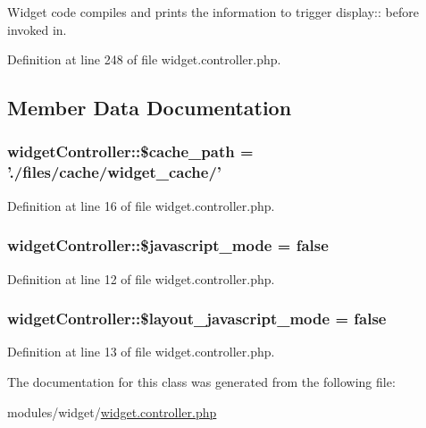 Widget code compiles and prints the information to trigger display\+:\+: before invoked in. 



Definition at line 248 of file widget.\+controller.\+php.



\subsection{Member Data Documentation}
\hypertarget{classwidgetController_a279375b189444d13250d8111910655c3}{
\subsubsection[{\$cache\+\_\+path}]{\setlength{\rightskip}{0pt plus 5cm}widget\+Controller\+::\$cache\+\_\+path = './files/cache/widget\+\_\+cache/'}}\label{classwidgetController_a279375b189444d13250d8111910655c3}


Definition at line 16 of file widget.\+controller.\+php.

\hypertarget{classwidgetController_a9879a9de581b205ffa63cc0297dcefab}{
\subsubsection[{\$javascript\+\_\+mode}]{\setlength{\rightskip}{0pt plus 5cm}widget\+Controller\+::\$javascript\+\_\+mode = false}}\label{classwidgetController_a9879a9de581b205ffa63cc0297dcefab}


Definition at line 12 of file widget.\+controller.\+php.

\hypertarget{classwidgetController_ab123ebb549e616c6e67bf79e73f56ac8}{
\subsubsection[{\$layout\+\_\+javascript\+\_\+mode}]{\setlength{\rightskip}{0pt plus 5cm}widget\+Controller\+::\$layout\+\_\+javascript\+\_\+mode = false}}\label{classwidgetController_ab123ebb549e616c6e67bf79e73f56ac8}


Definition at line 13 of file widget.\+controller.\+php.



The documentation for this class was generated from the following file\+:\begin{DoxyCompactItemize}
\item 
modules/widget/\hyperlink{widget_8controller_8php}{widget.\+controller.\+php}\end{DoxyCompactItemize}

